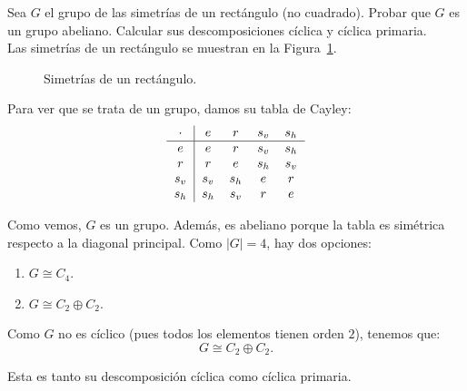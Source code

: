 \begin{ejercicio}\label{ej:7.4}
    Sea $G$ el grupo de las simetrías de un rectángulo (no cuadrado). Probar que $G$ es un grupo abeliano. Calcular sus descomposiciones cíclica y cíclica primaria.\\


    Las simetrías de un rectángulo se muestran en la Figura~\ref{fig:simetria_rectangulo}.
    \begin{figure}[h]
        \centering
        \caption{Simetrías de un rectángulo.}
        \label{fig:simetria_rectangulo}
    \end{figure}
    Para ver que se trata de un grupo, damos su tabla de Cayley:
    \begin{equation*}
        \begin{tabular}{c|cccc}
            $\cdot$ & $e$ & $r$ & $s_v$ & $s_h$ \\
            \hline
            $e$ & $e$ & $r$ & $s_v$ & $s_h$ \\
            $r$ & $r$ & $e$ & $s_h$ & $s_v$ \\
            $s_v$ & $s_v$ & $s_h$ & $e$ & $r$ \\
            $s_h$ & $s_h$ & $s_v$ & $r$ & $e$
        \end{tabular}
    \end{equation*}

    Como vemos, $G$ es un grupo. Además, es abeliano porque la tabla es simétrica respecto a la diagonal principal. Como $|G|=4$, hay dos opciones:
    \begin{enumerate}
        \item $G \cong C_4$.
        \item $G \cong C_2 \oplus C_2$.
    \end{enumerate}

    Como $G$ no es cíclico (pues todos los elementos tienen orden $2$), tenemos que:
    \begin{equation*}
        G \cong C_2 \oplus C_2.
    \end{equation*}

    Esta es tanto su descomposición cíclica como cíclica primaria.
\end{ejercicio}

